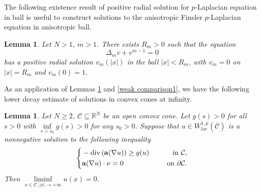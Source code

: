 \documentclass[12pt]{amsart}
\newtheorem{lem}[thm]{Lemma}
\theoremstyle{definition}
\theoremstyle{remark}
\theoremstyle{conclusion}
\theoremstyle{conjecture}
\numberwithin{equation}{section}
\begin{document}
The following existence result of positive radial solution for $p$-Laplacian equation in ball is useful to construct solutions to the anisotropic Finsler $p$-Laplacian equation in anisotropic ball.
\begin{lem}\label{lem2.8}\cite[Lemma 2.6]{SZ}
Let $N>1$, $m>1$. There exists $R_m>0$ such that the equation
\begin{equation*}\label{rs}
  \Delta_mv+v^{m-1}=0
\end{equation*}
has a positive radial solution $v_m(|x|)$ in the ball $|x|<R_m$, with $v_m=0$ on $|x|=R_m$ and $v_m(0)=1$.
\end{lem}
As an application of Lemmas \ref{lem2.8} and \ref{weak comparison1}, we have the following lower decay estimate of solutions in convex cones at infinity.
\begin{lem}\label{lem2.9}
 Let $N\geq2$, $\mathcal{C}\subseteq\mathbb{R}^{N}$ be an open convex cone. Let $g(s)>0$ for all $s>0$ with $\inf\limits_{s>s_0}g(s)>0$ for any $s_0>0$. Suppose that $u\in W^{1,p}_{loc}(\overline{\mathcal{C}})$ is a nonnegative solution to the following inequality
 \begin{equation}\label{eq2.6}
  \left\{
        \begin{aligned}
        &-\operatorname{div}\left({\bf{a}}(\nabla u)\right)\geq g(u) \quad\,\,\, &{\rm{in}} \,\, \mathcal{C}, \\
        &{\bf{a}}(\nabla u)\cdot \nu =0 \quad\,\,\, &{\rm{on}} \,\, \partial\mathcal{C}.
        \end{aligned}
        \right.
 \end{equation}
 Then $\liminf\limits_{x\in\mathcal{C},|x|\rightarrow+\infty}u(x)=0$.
\end{lem}
\end{document}
